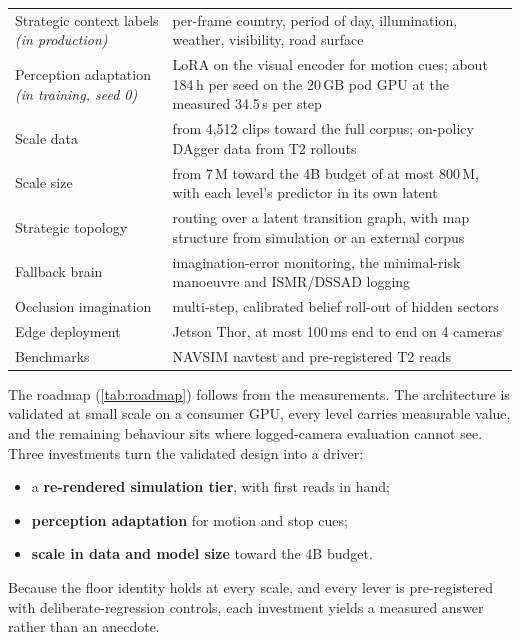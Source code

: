 \documentclass[10pt,twocolumn]{article}
\theoremstyle{remark}
\begin{document}
\begin{table}[!t]
\begin{tabularx}{\columnwidth}{@{}>{\raggedright\arraybackslash}p{24mm}>{\raggedright\arraybackslash}X@{}}
Strategic context labels \textit{(in production)} & per-frame country, period of day, illumination, weather, visibility, road surface \\
Perception adaptation \textit{(in training, seed 0)} & LoRA on the visual encoder for motion cues; about 184\,h per seed on the 20\,GB pod GPU at the measured 34.5\,s per step \\
Scale data & from 4,512 clips toward the full corpus; on-policy DAgger data from T2 rollouts \\
Scale size & from 7\,M toward the 4B budget of at most 800\,M, with each level's predictor in its own latent \\
Strategic topology & routing over a latent transition graph, with map structure from simulation or an external corpus \\
Fallback brain & imagination-error monitoring, the minimal-risk manoeuvre and ISMR/DSSAD logging \\
Occlusion imagination & multi-step, calibrated belief roll-out of hidden sectors \\
Edge deployment & Jetson Thor, at most 100\,ms end to end on 4 cameras \\
Benchmarks & NAVSIM navtest and pre-registered T2 reads \\
\bottomrule
\end{tabularx}
\end{table}

The roadmap (\cref{tab:roadmap}) follows from the measurements. The architecture is validated at small scale on a consumer GPU,
every level carries measurable value, and the remaining behaviour sits where logged-camera evaluation cannot see. Three investments
turn the validated design into a driver:
\begin{itemize}
  \item a \textbf{re-rendered simulation tier}, with first reads in hand;
  \item \textbf{perception adaptation} for motion and stop cues;
  \item \textbf{scale in data and model size} toward the 4B budget.
\end{itemize}
Because the floor identity holds at every scale, and every lever is pre-registered with deliberate-regression controls, each
investment yields a measured answer rather than an anecdote.
\end{document}
